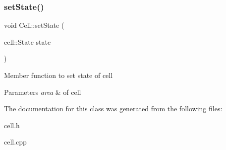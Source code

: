 \subsubsection{\texorpdfstring{set\+State()}{setState()}}
{\footnotesize\ttfamily void Cell\+::set\+State (\begin{DoxyParamCaption}\item[{cell\+::\+State}]{state }\end{DoxyParamCaption})}

Member function to set state of cell 
\begin{DoxyParams}{Parameters}
{\em area} & of cell \\
\hline
\end{DoxyParams}


The documentation for this class was generated from the following files\+:\begin{DoxyCompactItemize}
\item 
cell.\+h\item 
cell.\+cpp\end{DoxyCompactItemize}
